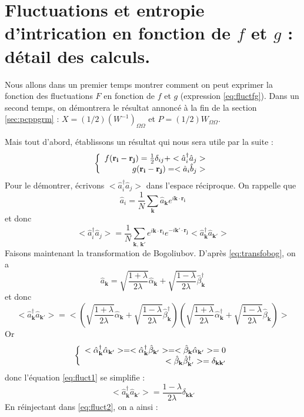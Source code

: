 \documentclass[a4paper, french]{report}
\newcommand{\an}{\hat{a}}
\newcommand{\cre}{\hat{a}^\dagger}
\newcommand{\ban}{\hat{b}}
\newcommand{\pos}[1]{\ensuremath{\mathbf{r_{#1}}}\xspace}
\newcommand{\ond}{\ensuremath{\mathbf{k}\xspace}}
\newcommand{\alcre}{\hat{\alpha}^\dagger_{\ond}}
\newcommand{\alan}{\hat{\alpha}_{\ond}}
\newcommand{\betcre}{\hat{\beta}^\dagger_{\ond}}
\newcommand{\betan}{\hat{\beta}_{\ond}}
\newcommand{\om}{\ensuremath{\Omega}\xspace}
\newcommand{\1}{\ensuremath{\ket{\om_1\bom_1}}\xspace}
\newcommand{\2}{\ensuremath{\ket{\om_2\bom_2}}\xspace}
\begin{document}
\chapter{Fluctuations et entropie d'intrication en fonction de $f$ et $g$ : détail des calculs.}
Nous allons dans un premier temps montrer comment on peut exprimer la fonction des fluctuations $F$ en fonction de $f$ et $g$ (expression \ref{eq:fluctfg}). Dans un second temps, on démontrera le résultat annoncé à la fin de la section \ref{sec:pcppgrm} : $X=(1/2)(W^{-1})_{\om\om}$ et $P=(1/2)W_{\om\om}$.

Mais tout d'abord, établissons un résultat qui nous sera utile par la suite :
\begin{equation}
\label{eq:fluct3}
\left\{
	\begin{array}{r c l}
		f(\pos i - \pos j)=\frac{1}{2} \delta_{ij}+<\cre_i\an_j>\\
		g(\pos i - \pos j)= <\an_i\ban_j>
	\end{array}
\right.
\end{equation}
Pour le démontrer, écrivons $<\cre_i\an_j>$ dans l'espace réciproque. On rappelle que
\[
	\an_i=\frac{1}{N}\sum_{\ond}\an_\ond e^{i\ond\cdot\pos{i}}
\]
et donc
\begin{equation}
\label{eq:fluct2}
	<\cre_i\an_j>=\frac{1}{N}\sum_{\ond \textbf{, } \ond'}e^{i\ond\cdot\pos i}e^{-i\ond'\cdot\pos j}<\cre_\ond\an_{\ond'}>
\end{equation}
Faisons maintenant la transformation de Bogoliubov. D'après \ref{eq:transfobog}, on a 
\[
	\an_\ond=\sqrt{\frac{1+\lambda}{2\lambda}}\alan+\sqrt{\frac{1-\lambda}{2\lambda}}\betcre
\]
et donc
\begin{equation}
\label{eq:fluct1}
	<\cre_\ond\an_{\ond'}>=<\left(\sqrt{\frac{1+\lambda}{2\lambda}}\alan+\sqrt{\frac{1-\lambda}{2\lambda}}\betcre\right)\left(\sqrt{\frac{1+\lambda}{2\lambda}}\alcre+\sqrt{\frac{1-\lambda}{2\lambda}}\betan\right)>
\end{equation}
Or
\begin{equation}
\left\{
	\begin{array}{r c l}
		<\alcre\hat \alpha_{\ond'}>=<\alcre\hat \beta_{\ond'}>=<\betan \hat \alpha_{\ond'}>=0\\
		<\betan\hat \beta^{\dagger}_{\ond'}>=\delta_{\ond \ond'}
	\end{array}
\right.
\end{equation}
donc l'équation \ref{eq:fluct1} se simplifie :
\[
	<\cre_\ond\an_{\ond'}>=\frac{1-\lambda}{2\lambda}\delta_{\ond \ond'}
\]
En réinjectant dans \ref{eq:fluct2}, on a ainsi :
\end{document}
